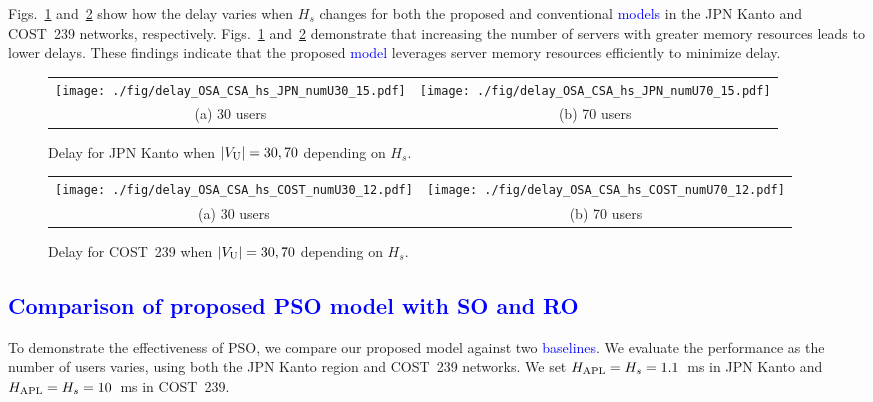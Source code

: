 \documentclass[10pt, letterpaper]{IEEEtran}
\newcommand\blue[1]{\textcolor{blue}{#1}}
\begin{document}
\begin{CJK}{UTF8}{ipxm}
Figs.~\ref{fig:delay_OSA_CSA_hs_JPN} and~\ref{fig:delay_OSA_CSA_hs_COST} show how the delay varies when $H_s$ changes for both the proposed and conventional \blue{models} in the JPN Kanto and COST~239 networks, respectively.
Figs.~\ref{fig:delay_OSA_CSA_hs_JPN} and~\ref{fig:delay_OSA_CSA_hs_COST} demonstrate that increasing the number of servers with greater memory resources leads to lower delays. 
These findings indicate that the proposed \blue{model} leverages server memory resources efficiently to minimize delay.
\begin{figure}[t]
  \begin{center}
      \begin{tabular}{cc}
      \texttt{[image: ./fig/delay\_OSA\_CSA\_hs\_JPN\_numU30\_15.pdf]} &
      \texttt{[image: ./fig/delay\_OSA\_CSA\_hs\_JPN\_numU70\_15.pdf]} \\
      (a) 30 users & (b) 70 users
      \end{tabular}
  \end{center}
  \caption{Delay for JPN Kanto when $|V_{\rm U}| = 30, 70$ depending on $H_s$.}
  \label{fig:delay_OSA_CSA_hs_JPN}
\end{figure}
\begin{figure}[t]
  \begin{center}
      \begin{tabular}{cc}
      \texttt{[image: ./fig/delay\_OSA\_CSA\_hs\_COST\_numU30\_12.pdf]} &
      \texttt{[image: ./fig/delay\_OSA\_CSA\_hs\_COST\_numU70\_12.pdf]} \\
      (a) 30 users & (b) 70 users
      \end{tabular}
  \end{center}
  \caption{Delay for COST~239 when $|V_{\rm U}| = 30, 70$ depending on $H_s$.}
  \label{fig:delay_OSA_CSA_hs_COST}
\end{figure}

\subsection{\blue{Comparison of proposed PSO model with SO and RO}}
To demonstrate the effectiveness of PSO, we compare our proposed model against two \blue{baselines}.
We evaluate the performance as the number of users varies, using both the JPN Kanto region and COST~239 networks.
We set $H_{\rm APL} = H_s = 1.1$~ms in JPN Kanto and $H_{\rm APL} = H_s = 10$~ms in COST~239.


\end{CJK}
\end{document}
